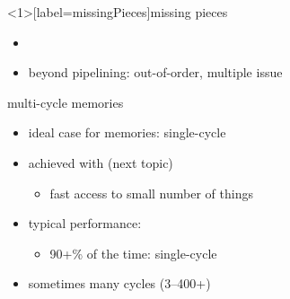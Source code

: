 
\begin{frame}<1>[label=missingPieces]{missing pieces}
    \begin{itemize}
    \item {}
    \item beyond pipelining: out-of-order, multiple issue
    \end{itemize}
\end{frame}


\begin{frame}{multi-cycle memories}
    \begin{itemize}
    \item ideal case for memories: single-cycle
    \item achieved with  (next topic)
        \begin{itemize}
        \item fast access to small number of things
        \end{itemize}
    \vspace{.5cm}
    \item typical performance:
        \begin{itemize}
        \item 90+\% of the time: single-cycle
        \end{itemize}
    \item sometimes many cycles (3--400+)
    \end{itemize}
\end{frame}

